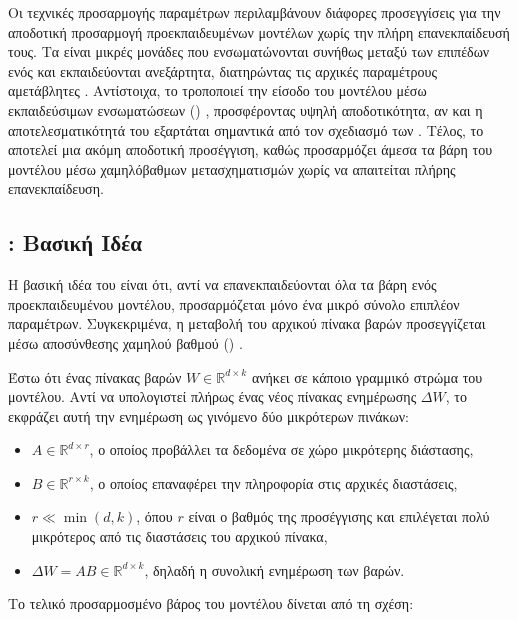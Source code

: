 Οι τεχνικές προσαρμογής παραμέτρων περιλαμβάνουν διάφορες προσεγγίσεις για την αποδοτική προσαρμογή προεκπαιδευμένων μοντέλων χωρίς την πλήρη επανεκπαίδευσή τους. Τα  είναι μικρές μονάδες που ενσωματώνονται συνήθως μεταξύ των επιπέδων ενός  και εκπαιδεύονται ανεξάρτητα, διατηρώντας τις αρχικές παραμέτρους αμετάβλητες \cite{houlsby2019parameter}. Αντίστοιχα, το  τροποποιεί την είσοδο του μοντέλου μέσω εκπαιδεύσιμων ενσωματώσεων () \cite{lester2021power}, προσφέροντας υψηλή αποδοτικότητα, αν και η αποτελεσματικότητά του εξαρτάται σημαντικά από τον σχεδιασμό των . Τέλος, το  αποτελεί μια ακόμη αποδοτική προσέγγιση, καθώς προσαρμόζει άμεσα τα βάρη του μοντέλου μέσω χαμηλόβαθμων μετασχηματισμών χωρίς να απαιτείται πλήρης επανεκπαίδευση.

\subsection{: Βασική Ιδέα}

Η βασική ιδέα του  είναι ότι, αντί να επανεκπαιδεύονται όλα τα βάρη ενός προεκπαιδευμένου μοντέλου, προσαρμόζεται μόνο ένα μικρό σύνολο επιπλέον παραμέτρων. Συγκεκριμένα, η μεταβολή του αρχικού πίνακα βαρών προσεγγίζεται μέσω αποσύνθεσης χαμηλού βαθμού () \cite{hu2021lora}.

Έστω ότι ένας πίνακας βαρών \(W \in \mathbb{R}^{d \times k}\) ανήκει σε κάποιο γραμμικό στρώμα του μοντέλου. Αντί να υπολογιστεί πλήρως ένας νέος πίνακας ενημέρωσης \(\Delta W\), το  εκφράζει αυτή την ενημέρωση ως γινόμενο δύο μικρότερων πινάκων:

\begin{itemize}
    \item \( A \in \mathbb{R}^{d \times r} \), ο οποίος προβάλλει τα δεδομένα σε χώρο μικρότερης διάστασης,
    \item \( B \in \mathbb{R}^{r \times k} \), ο οποίος επαναφέρει την πληροφορία στις αρχικές διαστάσεις,
    \item \( r \ll \min(d,k) \), όπου \(r\) είναι ο βαθμός της προσέγγισης και επιλέγεται πολύ μικρότερος από τις διαστάσεις του αρχικού πίνακα,
    \item \( \Delta W = AB \in \mathbb{R}^{d \times k} \), δηλαδή η συνολική ενημέρωση των βαρών.
\end{itemize}

Το τελικό προσαρμοσμένο βάρος του μοντέλου δίνεται από τη σχέση:

